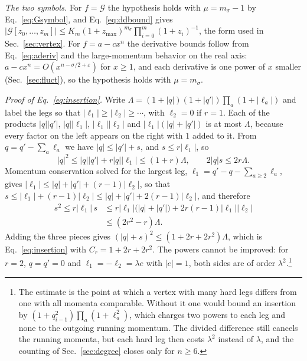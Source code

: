 \documentclass[aps,prd,10pt,twocolumn,superscriptaddress,nofootinbib,floatfix,longbibliography]{revtex4-2}
\begin{document}
\textit{The two symbols.} For $f=\mathcal G$ the hypothesis holds with $\mu=m_\sigma-1$ by Eq.~\eqref{eq:Gsymbol}, and Eq.~\eqref{eq:ddbound} gives $|\mathcal G[z_0,\dots,z_m]|\le K_m(1+z_{\max})^{m_\sigma}\prod_{i=0}^m(1+z_i)^{-1}$, the form used in Sec.~\ref{sec:vertex}. For $f=a-cx^n$ the derivative bounds follow from Eq.~\eqref{eq:aderiv} and the large-momentum behavior on the real axis: $a-cx^n=O(x^{n-\sigma/2+\varepsilon})$ for $x\ge1$, and each derivative is one power of $x$ smaller (Sec.~\ref{sec:fluct}), so the hypothesis holds with $\mu=m_\sigma$.

\textit{Proof of Eq.~\eqref{eq:insertion}.} Write $\Lambda=(1+|q|)(1+|q'|)\prod_a(1+|\ell_a|)$ and label the legs so that $|\ell_1|\ge|\ell_2|\ge\cdots$, with $\ell_2=0$ if $r=1$. Each of the products $|q||q'|$, $|q||\ell_1|$, $|\ell_1||\ell_2|$ and $|\ell_1|(|q|+|q'|)$ is at most $\Lambda$, because every factor on the left appears on the right with $1$ added to it. From $q=q'-\sum_a\ell_a$ we have $|q|\le|q'|+s$, and $s\le r|\ell_1|$, so
\[
|q|^2\le|q||q'|+r|q||\ell_1|\le(1+r)\Lambda,\qquad 2|q|s\le2r\Lambda .
\]
Momentum conservation solved for the largest leg, $\ell_1=q'-q-\sum_{a\ge2}\ell_a$, gives $|\ell_1|\le|q|+|q'|+(r-1)|\ell_2|$, so that $s\le|\ell_1|+(r-1)|\ell_2|\le|q|+|q'|+2(r-1)|\ell_2|$, and therefore
\[
\begin{aligned}
s^2\le r|\ell_1|\,s&\le r|\ell_1|\bigl(|q|+|q'|\bigr)+2r(r-1)|\ell_1||\ell_2|\\
&\le(2r^2-r)\Lambda .
\end{aligned}
\]
Adding the three pieces gives $(|q|+s)^2\le(1+2r+2r^2)\Lambda$, which is Eq.~\eqref{eq:insertion} with $C_r=1+2r+2r^2$. The powers cannot be improved: for $r=2$, $q=q'=0$ and $\ell_1=-\ell_2=\lambda e$ with $|e|=1$, both sides are of order $\lambda^2$.\footnote{The estimate is the point at which a vertex with many hard legs differs from one with all momenta comparable. Without it one would bound an insertion by $(1+q_{i-1}^2)\prod_a(1+\ell_a^2)$, which charges two powers to each leg and none to the outgoing running momentum. The divided difference still cancels the running momenta, but each hard leg then costs $\lambda^2$ instead of $\lambda$, and the counting of Sec.~\ref{sec:degree} closes only for $n\ge6$.}
\end{document}
